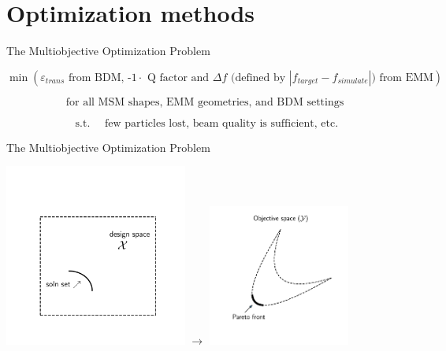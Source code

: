 \documentclass[aspectratio=169]{beamer}
\begin{document}
\section{Optimization methods}

\begin{frame}{The Multiobjective Optimization Problem}

    $$
    \min (\text{$\varepsilon_{trans}$ from BDM, -1$\cdot$ Q factor and $\Delta f$ (defined by $\left|f_{target} - f_{simulate}\right|$) from EMM})
    $$

    $$
    \text{for all  MSM shapes, EMM geometries, and BDM settings}
    $$
    
    $$
    \text{ s.t. } \quad \text{few particles lost, beam quality is sufficient, etc.}
    $$
    
\end{frame}

\begin{frame}{The Multiobjective Optimization Problem}

    \centering
    \includegraphics[width=0.45\textwidth]{../img/moo_new/efficient_set-eps-converted-to.pdf}
    $\rightarrow$
    \includegraphics[width=0.35\textwidth]{../img/moo_new/pareto_set-eps-converted-to.pdf}
\end{frame}
\end{document}
